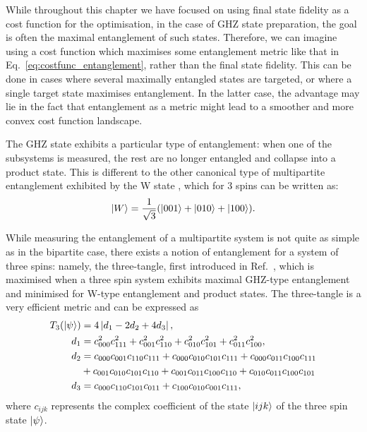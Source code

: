 While throughout this chapter we have focused on using final state fidelity as a cost function for the optimisation, in the case of GHZ state preparation, the goal is often the maximal entanglement of such states. Therefore, we can imagine using a cost function which maximises some entanglement metric like that in Eq.~\eqref{eq:costfunc_entanglement}, rather than the final state fidelity. This can be done in cases where several maximally entangled states are targeted, or where a single target state maximises entanglement. In the latter case, the advantage may lie in the fact that entanglement as a metric might lead to a smoother and more convex cost function landscape.

The GHZ state exhibits a particular type of entanglement: when one of the subsystems is measured, the rest are no longer entangled and collapse into a product state. This is different to the other canonical type of multipartite entanglement exhibited by the W state \cite{cabello_bells_2002}, which for 3 spins can be written as:
\begin{equation}\label{eq:W_state}
    \ket{W} = \frac{1}{\sqrt{3}}(\ket{001} + \ket{010} + \ket{100}).
\end{equation}

While measuring the entanglement of a multipartite system is not quite as simple as in the bipartite case, there exists a notion of entanglement for a system of three spins: namely, the three-tangle, first introduced in Ref.~\cite{coffman_distributed_2000}, which is maximised when a three spin system exhibits maximal GHZ-type entanglement and minimised for W-type entanglement and product states. The three-tangle is a very efficient metric and can be expressed as
\begin{equation}\label{eq:3-tangle}
	\begin{aligned}
		T_3(\ket{\psi}) &= 4 \left| d_1 - 2 d_2 + 4 d_3 \right|, \\
		d_1 &= c^2_{000}c^2_{111} + c^2_{001}c^2_{110} + c^2_{010}c^2_{101} + c^2_{011}c^2_{100}, \\
		d_2 &= c_{000}c_{001}c_{110}c_{111} + c_{000}c_{010}c_{101}c_{111} + c_{000}c_{011}c_{100}c_{111} \\
		 &+ c_{001}c_{010}c_{101}c_{110} + c_{001}c_{011}c_{100}c_{110} + c_{010}c_{011}c_{100}c_{101} \\
		d_3 &= c_{000}c_{110}c_{101}c_{011} + c_{100}c_{010}c_{001}c_{111},
	\end{aligned}
\end{equation}
where $c_{ijk}$ represents the complex coefficient of the state $\ket{ijk}$ of the three spin state $\ket{\psi}$. 

